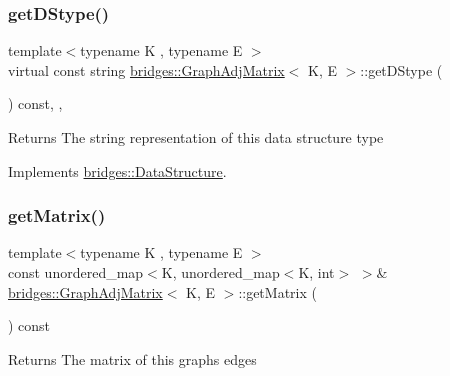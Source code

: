 \subsubsection{\texorpdfstring{get\+D\+Stype()}{getDStype()}}
{\footnotesize\ttfamily template$<$typename K , typename E $>$ \\
virtual const string \hyperlink{classbridges_1_1_graph_adj_matrix}{bridges\+::\+Graph\+Adj\+Matrix}$<$ K, E $>$\+::get\+D\+Stype (\begin{DoxyParamCaption}{ }\end{DoxyParamCaption}) const\hspace{0.3cm}{\ttfamily [inline]}, {\ttfamily [override]}, {\ttfamily [virtual]}}

\begin{DoxyReturn}{Returns}
The string representation of this data structure type 
\end{DoxyReturn}


Implements \hyperlink{classbridges_1_1_data_structure_a957a63b106e340bc753620c650632bdc}{bridges\+::\+Data\+Structure}.

\hypertarget{classbridges_1_1_graph_adj_matrix_a074539c082e58f3ed89e2b5ad281ede3}{}\label{classbridges_1_1_graph_adj_matrix_a074539c082e58f3ed89e2b5ad281ede3} 
\subsubsection{\texorpdfstring{get\+Matrix()}{getMatrix()}}
{\footnotesize\ttfamily template$<$typename K , typename E $>$ \\
const unordered\+\_\+map$<$K, unordered\+\_\+map$<$K, int$>$ $>$\& \hyperlink{classbridges_1_1_graph_adj_matrix}{bridges\+::\+Graph\+Adj\+Matrix}$<$ K, E $>$\+::get\+Matrix (\begin{DoxyParamCaption}{ }\end{DoxyParamCaption}) const\hspace{0.3cm}{\ttfamily [inline]}}

\begin{DoxyReturn}{Returns}
The matrix of this graphs edges 
\end{DoxyReturn}
\hypertarget{classbridges_1_1_graph_adj_matrix_a66ca65ceecdb2b30209749330c0a8971}{}\label{classbridges_1_1_graph_adj_matrix_a66ca65ceecdb2b30209749330c0a8971} 
